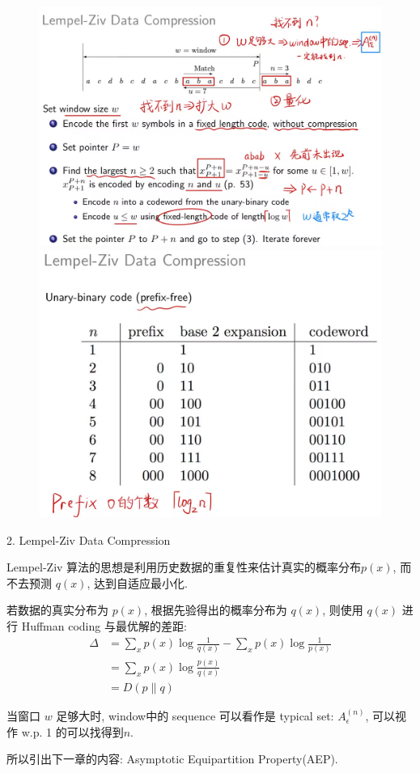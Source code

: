 \begin{figure}[htbp]
    \centering
    \includegraphics[width=1\textwidth]{./figures/chapter3/lempel_ziv1.png}
    \includegraphics[width=1\textwidth]{./figures/chapter3/lempel_ziv2.png}
\end{figure}
2. Lempel-Ziv Data Compression

Lempel-Ziv 算法的思想是利用历史数据的重复性来估计真实的概率分布$p(x)$, 而不去预测 $q(x)$, 达到自适应最小化.

若数据的真实分布为 $p(x)$, 根据先验得出的概率分布为 $q(x)$, 则使用 $q(x)$ 进行 Huffman coding 与最优解的差距:
\begin{align*}
\Delta &= \sum_{x} p(x) \log \frac{1}{q(x)} - \sum_{x} p(x) \log \frac{1}{p(x)} \\
&= \sum_{x} p(x) \log \frac{p(x)}{q(x)} \\
&= D(p\|q)
\end{align*}

当窗口 $w$ 足够大时, window中的 sequence 可以看作是 typical set: $A_{\epsilon}^{(n)}$, 可以视作 w.p. 1 的可以找得到$n$.

所以引出下一章的内容: Asymptotic Equipartition Property(AEP).